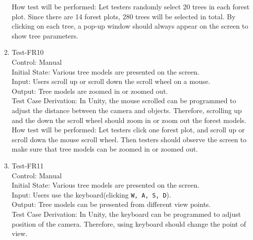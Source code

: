 \documentclass[12pt, titlepage]{article}
\begin{document}
\begin{enumerate}
How test will be performed:  Let testers randomly select 20 trees in each forest plot.
Since there are 14 forest plots, 280 trees will be selected in total. By clicking on
each tree, a pop-up window should always appear on the screen to show tree parameters.

\item{Test-FR10\\}
Control: Manual\\ 

Initial State: Various tree models are presented on the screen.\\

Input: Users scroll up or scroll down the scroll wheel on a mouse.\\

Output: Tree models are zoomed in or zoomed out.\\

Test Case Derivation: In Unity, the mouse scrolled can be programmed to adjust the
distance between the camera and objects. Therefore, scrolling up and the down the 
scroll wheel should zoom in or zoom out the forest models.\\
					
How test will be performed:  Let testers click one forest plot, and scroll up or
scroll down the mouse scroll wheel. Then testers should observe the screen to make sure
that tree models can be zoomed in or zoomed out.

\item{Test-FR11\\}
Control: Manual\\ 

Initial State: Various tree models are presented on the screen.\\

Input: Users use the keyboard(clicking \verb|W, A, S, D|).\\

Output: Tree models can be presented from different view points.\\

Test Case Derivation: In Unity, the keyboard can be programmed to adjust position
of the camera. Therefore, using keyboard should change the point of view.\\
					

\end{enumerate}
\end{document}
